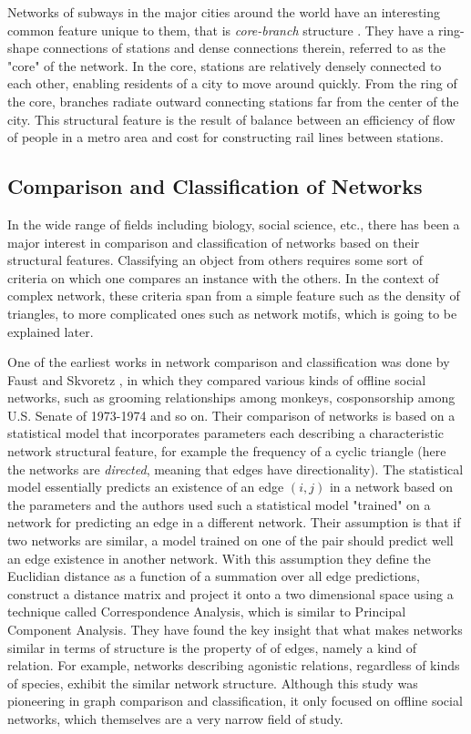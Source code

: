 \documentclass{article}
\begin{document}
Networks of subways in the major cities around the world have an interesting common feature unique to them, that is \textit{core-branch} structure \cite{Train}. They have a ring-shape connections of stations and dense connections therein, referred to as the "core" of the network. In the core, stations are relatively densely connected to each other, enabling residents of a city to move around quickly. From the ring of the core, branches radiate outward connecting stations far from the center of the city. This structural feature is the result of balance between an efficiency of flow of people in a metro area and cost for constructing rail lines between stations. 


	
	\subsection{Comparison and Classification of Networks}
	In the wide range of fields including biology, social science, etc., there has been a major interest in comparison and classification of networks based on their structural features. Classifying an object from others requires some sort of criteria on which one compares an instance with the others. In the context of complex network, these criteria span from a simple feature such as the density of triangles, to more complicated ones such as network motifs, which is going to be explained later.
	
	One of the earliest works in network comparison and classification was done by Faust and Skvoretz \cite{Faust.Skvoretz2002Comparing}, in which they compared various kinds of offline social networks, such as grooming relationships among monkeys, cosponsorship among U.S. Senate of 1973-1974 and so on. Their comparison of networks is based on a statistical model that incorporates parameters each describing a characteristic network structural feature, for example the frequency of a cyclic triangle (here the networks are \textit{directed}, meaning that edges have directionality). The statistical model essentially predicts an existence of an edge $(i,j)$ in a network based on the parameters and the authors used such a statistical model "trained" on a network for predicting an edge in a different network. Their assumption is that if two networks are similar, a model trained on one of the pair should predict well an edge existence in another network. With this assumption they define the Euclidian distance as a function of a summation over all edge predictions, construct a distance matrix and project it onto a two dimensional space using a technique called Correspondence Analysis, which is similar to Principal Component Analysis. They have found the key insight that what makes networks similar in terms of structure is the property of of edges, namely a kind of relation. For example, networks describing agonistic relations, regardless of kinds of species, exhibit the similar network structure. Although this study was pioneering in graph comparison and classification, it only focused on offline social networks, which themselves are a very narrow field of study.
	
\end{document}
